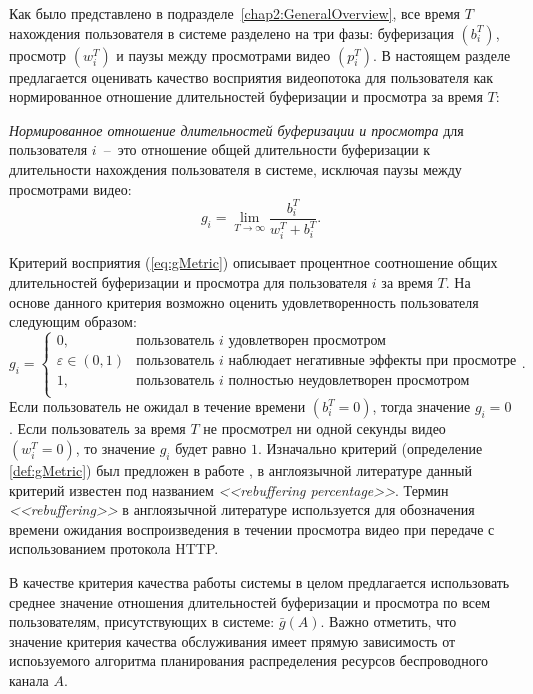 Как было представлено в подразделе~\ref{chap2:GeneralOverview}, все время $T$ нахождения пользователя в системе разделено на три фазы: буферизация $\left( b_i^T \right)$, просмотр $\left( w_i^T \right)$ и паузы между просмотрами видео $\left( p_i^T \right)$. В настоящем разделе предлагается оценивать качество восприятия видеопотока для пользователя как нормированное отношение длительностей буферизации и просмотра за время $T$:
\begin{definition}
\label{def:gMetric}
    \emph{Нормированное отношение длительностей буферизации и просмотра} для пользователя $i$~--~это отношение общей длительности буферизации к длительности нахождения пользователя в системе, исключая паузы между просмотрами видео:
    \emph{
    \begin{equation}
    	\label{eq:gMetric}
		g_i = \lim\limits_{T\rightarrow\infty} \frac{b_i^T}{w_i^T + b_i^T}.
	\end{equation}
	}
\end{definition}

Критерий восприятия (\ref{eq:gMetric}) описывает процентное соотношение общих длительностей буферизации и просмотра для пользователя $i$ за время $T$. На основе данного критерия возможно оценить удовлетворенность пользователя следующим образом:
$$g_i=
\begin{cases}
0, & \text{пользователь $i$ удовлетворен просмотром}\\
\varepsilon \in (0,1) & \text{пользователь $i$ наблюдает негативные эффекты при просмотре}\\
1, & \text{пользователь $i$ полностью неудовлетворен просмотром}\\
\end{cases}.
$$
Если пользователь не ожидал в течение времени $\left(b_i^T = 0\right)$, тогда значение $g_i = 0$.
Если пользователь за время $T$ не просмотрел ни одной секунды видео $\left(w_i^T = 0\right)$, то значение $g_i$ будет равно $1$. Изначально критерий (определение \ref{def:gMetric}) был предложен в работе \cite{QoE_enhancement}, в англоязычной литературе данный критерий известен под названием \textit{<<rebuffering percentage>>}. Термин \textit{<<rebuffering>>} в англоязычной литературе используется для обозначения времени ожидания воспроизведения в течении просмотра видео при передаче с использованием протокола HTTP.

В качестве критерия качества работы системы в целом предлагается использовать среднее значение отношения длительностей буферизации и просмотра по всем пользователям, присутствующих в системе: $\bar{g}\left(A\right)$. Важно отметить, что значение критерия качества обслуживания имеет прямую зависимость от испоьзуемого алгоритма планирования распределения ресурсов беспроводного канала $A$.

